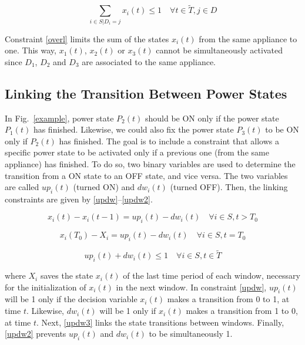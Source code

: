\begin{equation} \label{overl}
   \sum_{i \in S | D_{i} = j} x_i(t) \leq 1 \quad \forall t \in \tilde{T}, j \in D
\end{equation}

Constraint \eqref{overl} limits the sum of the states $x_i(t)$ from the same appliance to one. This way, $x_1(t)$, $x_2(t)$ or $x_3(t)$ cannot be simultaneously activated since $D_1$, $D_2$ and $D_3$ are associated to the same appliance.

\subsection{Linking the Transition Between Power States}

In Fig.~\ref{example}, power state $P_2(t)$ should be ON only if the power state $P_1(t)$ has finished. Likewise, we could also fix the power state $P_3(t)$ to be ON only if $P_2(t)$ has finished. The goal is to include a constraint that allows a specific power state to be activated only if a previous one (from the same appliance) has finished. To do so, two binary variables are used to determine the transition from a ON state to an OFF state, and vice versa. The two variables are called $up_i(t)$ (turned ON) and $dw_i(t)$ (turned OFF). Then, the linking constraints are given by \eqref{updw}--\eqref{updw2}.
%

\begin{equation} \label{updw}
    x_i(t) - x_i(t-1) = up_i(t) - dw_i(t) \quad \forall i \in S, t > T_0
\end{equation}


\begin{equation} \label{updw3}
    x_i(T_0) - X_i = up_i(t) - dw_i(t) \quad \forall i \in S, t = T_0
\end{equation}

\begin{equation} \label{updw2}
    up_i(t) + dw_i(t) \leq 1 \quad \forall i \in S, t \in \tilde{T}
\end{equation}

\noindent where $X_i$ saves the state $x_i(t)$ of the last time period of each window, necessary for the initialization of $x_i(t)$ in the next window. In constraint \eqref{updw}, $up_i(t)$ will be 1 only if the decision variable $x_i(t)$ makes a transition from 0 to 1, at time $t$. Likewise, $dw_i(t)$ will be 1 only if $x_i(t)$ makes a transition from 1 to 0, at time $t$. Next, \eqref{updw3} links the state transitions between windows. Finally, \eqref{updw2} prevents $up_i(t)$ and $dw_i(t)$ to be simultaneously 1.

